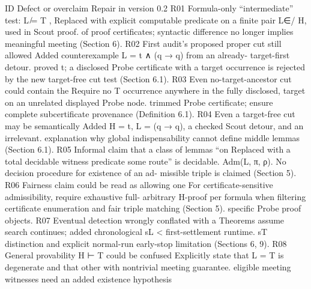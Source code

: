 ID            Defect or overclaim                               Repair in version 0.2
R01           Formula-only “intermediate” test: L ̸= T ,        Replaced with explicit computable predicate on a finite pair
              L∈/ H, used in Scout proof.                       of proof certificates; syntactic difference no longer implies
                                                                meaningful meeting (Section 6).
R02           First audit’s proposed proper cut still allowed   Added counterexample L = t ∧ (q → q) from an already-
              target-first detour.                              proved t; a disclosed Probe certificate with a target occurrence
                                                                is rejected by the new target-free cut test (Section 6.1).
R03           Even no-target-ancestor cut could contain the     Require no T occurrence anywhere in the fully disclosed,
              target on an unrelated displayed Probe node.      trimmed Probe certificate; ensure complete subcertificate
                                                                provenance (Definition 6.1).
R04           Even a target-free cut may be semantically        Added H = {t}, L = (q → q), a checked Scout detour, and an
              irrelevant.                                       explanation why global indispensability cannot define middle
                                                                lemmas (Section 6.1).
R05           Informal claim that a class of lemmas “on         Replaced with a total decidable witness predicate
              some route” is decidable.                         Adm(L, π, ρ). No decision procedure for existence of an ad-
                                                                missible triple is claimed (Section 5).
R06           Fairness claim could be read as allowing one      For certificate-sensitive admissibility, require exhaustive full-
              arbitrary H-proof per formula when filtering      certificate enumeration and fair triple matching (Section 5).
              specific Probe proof objects.
R07           Eventual detection wrongly conflated with a       Theorems assume search continues; added chronological sL <
              first-settlement runtime.                         sT distinction and explicit normal-run early-stop limitation
                                                                (Sections 6, 9).
R08           General provability H ⊢ T could be confused       Explicitly state that L = T is degenerate and that other
              with nontrivial meeting guarantee.                eligible meeting witnesses need an added existence hypothesis

